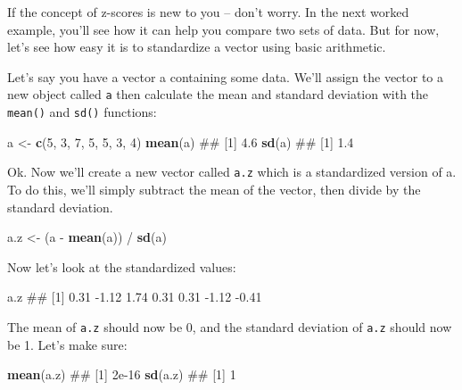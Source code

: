 \documentclass[]{book}
\newenvironment{Shaded}{\begin{snugshade}}{\end{snugshade}}
\newcommand{\KeywordTok}[1]{\textcolor[rgb]{0.13,0.29,0.53}{\textbf{{#1}}}}
\newcommand{\DecValTok}[1]{\textcolor[rgb]{0.00,0.00,0.81}{{#1}}}
\newcommand{\StringTok}[1]{\textcolor[rgb]{0.31,0.60,0.02}{{#1}}}
\newcommand{\NormalTok}[1]{{#1}}
\theoremstyle{definition}
\theoremstyle{definition}
\theoremstyle{remark}
\begin{document}
If the concept of z-scores is new to you -- don't worry. In the next
worked example, you'll see how it can help you compare two sets of data.
But for now, let's see how easy it is to standardize a vector using
basic arithmetic.

Let's say you have a vector a containing some data. We'll assign the
vector to a new object called \texttt{a} then calculate the mean and
standard deviation with the \texttt{mean()} and \texttt{sd()} functions:

\begin{Shaded}
\begin{Highlighting}[]
\NormalTok{a <-}\StringTok{ }\KeywordTok{c}\NormalTok{(}\DecValTok{5}\NormalTok{, }\DecValTok{3}\NormalTok{, }\DecValTok{7}\NormalTok{, }\DecValTok{5}\NormalTok{, }\DecValTok{5}\NormalTok{, }\DecValTok{3}\NormalTok{, }\DecValTok{4}\NormalTok{)}
\KeywordTok{mean}\NormalTok{(a)}
\NormalTok{## [1] 4.6}
\KeywordTok{sd}\NormalTok{(a)}
\NormalTok{## [1] 1.4}
\end{Highlighting}
\end{Shaded}

Ok. Now we'll create a new vector called \texttt{a.z} which is a
standardized version of a. To do this, we'll simply subtract the mean of
the vector, then divide by the standard deviation.

\begin{Shaded}
\begin{Highlighting}[]
\NormalTok{a.z <-}\StringTok{ }\NormalTok{(a -}\StringTok{ }\KeywordTok{mean}\NormalTok{(a)) /}\StringTok{ }\KeywordTok{sd}\NormalTok{(a)}
\end{Highlighting}
\end{Shaded}

Now let's look at the standardized values:

\begin{Shaded}
\begin{Highlighting}[]
\NormalTok{a.z}
\NormalTok{## [1]  0.31 -1.12  1.74  0.31  0.31 -1.12 -0.41}
\end{Highlighting}
\end{Shaded}

The mean of \texttt{a.z} should now be 0, and the standard deviation of
\texttt{a.z} should now be 1. Let's make sure:

\begin{Shaded}
\begin{Highlighting}[]
\KeywordTok{mean}\NormalTok{(a.z)}
\NormalTok{## [1] 2e-16}
\KeywordTok{sd}\NormalTok{(a.z)}
\NormalTok{## [1] 1}
\end{Highlighting}
\end{Shaded}
\end{document}
